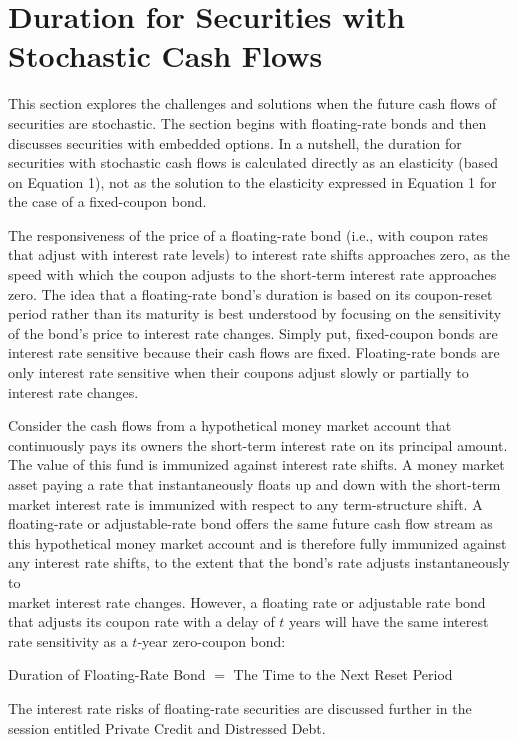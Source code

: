 \documentclass[11pt]{article}
\begin{document}
\section*{Duration for Securities with Stochastic Cash Flows}
This section explores the challenges and solutions when the future cash flows of securities are stochastic. The section begins with floating-rate bonds and then discusses securities with embedded options. In a nutshell, the duration for securities with stochastic cash flows is calculated directly as an elasticity (based on Equation 1), not as the solution to the elasticity expressed in Equation 1 for the case of a fixed-coupon bond.

The responsiveness of the price of a floating-rate bond (i.e., with coupon rates that adjust with interest rate levels) to interest rate shifts approaches zero, as the speed with which the coupon adjusts to the short-term interest rate approaches zero. The idea that a floating-rate bond's duration is based on its coupon-reset period rather than its maturity is best understood by focusing on the sensitivity of the bond's price to interest rate changes. Simply put, fixed-coupon bonds are interest rate sensitive because their cash flows are fixed. Floating-rate bonds are only interest rate sensitive when their coupons adjust slowly or partially to interest rate changes.

Consider the cash flows from a hypothetical money market account that continuously pays its owners the short-term interest rate on its principal amount. The value of this fund is immunized against interest rate shifts. A money market asset paying a rate that instantaneously floats up and down with the short-term market interest rate is immunized with respect to any term-structure shift. A floating-rate or adjustable-rate bond offers the same future cash flow stream as this hypothetical money market account and is therefore fully immunized against any interest rate shifts, to the extent that the bond's rate adjusts instantaneously to\\
market interest rate changes. However, a floating rate or adjustable rate bond that adjusts its coupon rate with a delay of $t$ years will have the same interest rate sensitivity as a $t$-year zero-coupon bond:

Duration of Floating-Rate Bond $=$ The Time to the Next Reset Period

The interest rate risks of floating-rate securities are discussed further in the session entitled Private Credit and Distressed Debt.
\end{document}
